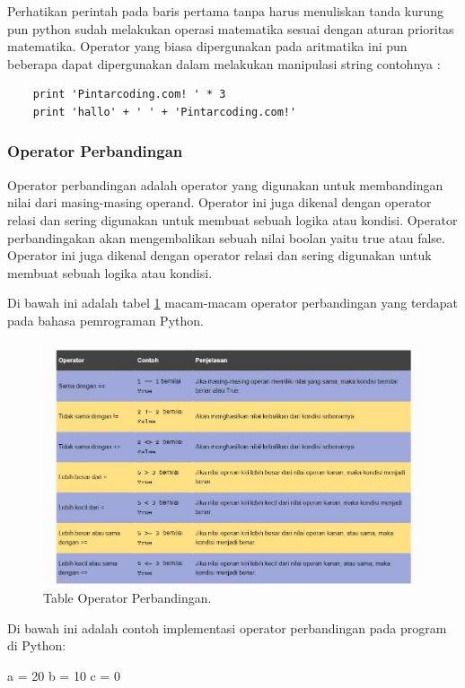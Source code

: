 Perhatikan perintah pada baris pertama tanpa harus menuliskan tanda kurung pun python sudah melakukan operasi matematika sesuai dengan aturan prioritas matematika. Operator yang biasa dipergunakan pada aritmatika ini pun beberapa dapat dipergunakan dalam melakukan manipulasi string contohnya :
\begin{verbatim}
	print 'Pintarcoding.com! ' * 3
	print 'hallo' + ' ' + 'Pintarcoding.com!'
\end{verbatim}


\subsubsection{Operator Perbandingan}
Operator perbandingan adalah operator yang digunakan untuk membandingan nilai dari masing-masing operand. Operator ini juga dikenal dengan operator relasi dan sering digunakan untuk membuat sebuah logika atau kondisi. Operator perbandingakan akan mengembalikan sebuah nilai boolan yaitu true atau false. Operator ini juga dikenal dengan operator relasi dan sering digunakan untuk membuat sebuah logika atau kondisi.

Di bawah ini adalah tabel \ref{tableperbandingan} macam-macam operator perbandingan yang terdapat pada bahasa pemrograman Python.
\begin{figure}[ht]
	\centerline{\includegraphics[width=1\textwidth]{Plagiarisme/tableperbandingan.JPG}}
	\caption{Table Operator Perbandingan.}
	\label{tableperbandingan}
\end{figure}

Di bawah ini adalah contoh implementasi operator perbandingan pada program di Python:

a = 20
b = 10
c = 0

